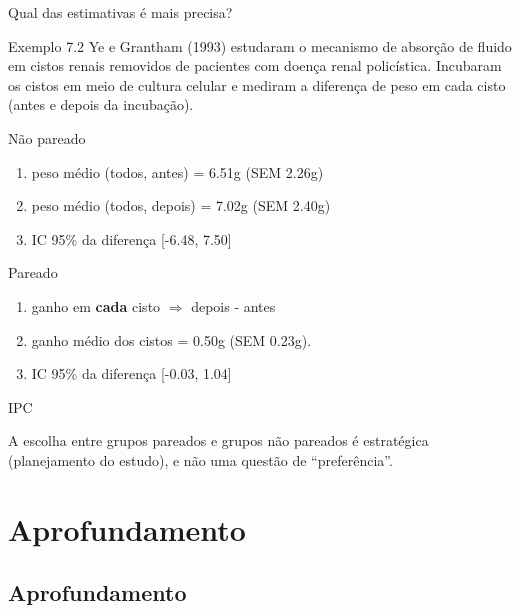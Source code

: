 \documentclass{beamer}
\begin{document}
\begin{frame}{\scriptsize Qual das estimativas é mais precisa?}
  \begin{exampleblock}{Exemplo 7.2}
    \scriptsize
    Ye e Grantham (1993) estudaram o mecanismo de absorção de fluido em cistos renais removidos de pacientes com doença renal policística.
    Incubaram os cistos em meio de cultura celular e mediram a diferença de peso em cada cisto (antes e depois da incubação).

    \scriptsize
    \begin{exampleblock}{Não pareado}
      \footnotesize
      \begin{enumerate}
        \footnotesize
      \item<2,4> peso médio (todos, antes) = 6.51g (SEM 2.26g)
      \item<2,4> peso médio (todos, depois) = 7.02g (SEM 2.40g)
      \item<2,4> IC 95\% da diferença [-6.48, 7.50]
      \end{enumerate}
    \end{exampleblock}
    \begin{exampleblock}{Pareado}
      \footnotesize
      \begin{enumerate}
        \footnotesize
      \item<3,4> ganho em {\bf cada} cisto $\Rightarrow$ depois - antes
      \item<3,4> ganho médio dos cistos = 0.50g (SEM 0.23g).
      \item<3,4> IC 95\% da diferença [-0.03, 1.04]
      \end{enumerate}
    \end{exampleblock}
  \end{exampleblock}
\end{frame}

\begin{frame}{\scriptsize IPC}
  \begin{block}{}
    A escolha entre grupos pareados e grupos não pareados é estratégica (planejamento do estudo), e não uma questão de ``preferência''.
  \end{block}
\end{frame}
\section{Aprofundamento}

\subsection{Aprofundamento}
\end{document}
